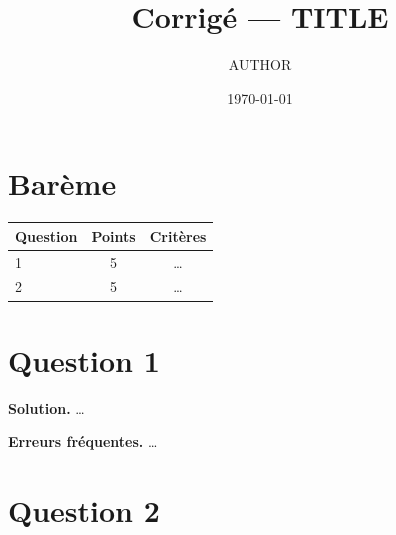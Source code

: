 \documentclass[11pt]{article}
\title{Corrigé — {{TITLE}}}
\author{{{AUTHOR}}}
\date{\today}
\begin{document}
\maketitle
\section*{Barème}
\begin{tabular}{lcc}\toprule Question & Points & Critères\\\midrule 1 & 5 & \dots\\ 2 & 5 & \dots\\\bottomrule\end{tabular}
\section*{Question 1}
\textbf{Solution.} \dots

\textbf{Erreurs fréquentes.} \dots
\section*{Question 2}
\end{document}
